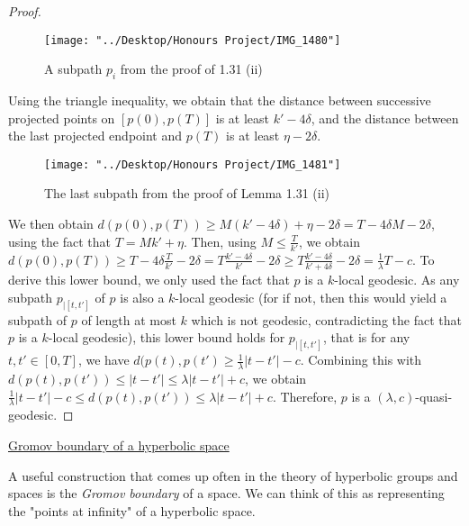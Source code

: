 \documentclass[12pt]{article}
\newcommand{\vs}{\vskip10pt}
\begin{document}
\begin{proof}
		
\begin{figure} [H]
	\centering
	\texttt{[image: "../Desktop/Honours Project/IMG\_1480"]}
	\caption{A subpath $p_i$ from the proof of 1.31 (ii)}
	\label{fig:img1480}
\end{figure}
		
		Using the triangle inequality, we obtain that the distance between successive projected points on $[p(0), p(T)]$ is at least $k' - 4 \delta$, and the distance between the last projected endpoint and $p(T)$ is at least $\eta - 2 \delta$. 
		
		
\begin{figure} [H]
	\centering
	\texttt{[image: "../Desktop/Honours Project/IMG\_1481"]}
	\caption{The last subpath from the proof of Lemma 1.31 (ii)}
	\label{fig:img1481}
\end{figure}
		
		 We then obtain $d(p(0), p(T)) \geq M(k' - 4 \delta) + \eta - 2 \delta = T - 4 \delta M - 2 \delta$, using the fact that $T = Mk' + \eta$. Then, using $M \leq \frac{T}{k'}$, we obtain $d(p(0), p(T)) \geq T - 4 \delta \frac{T}{k'} - 2 \delta = T \frac{k' - 4 \delta}{k'} - 2 \delta \geq T \frac{k' - 4 \delta}{k' + 4 \delta} - 2 \delta = \frac{1}{\lambda} T - c$. To derive this lower bound, we only used the fact that $p$ is a $k$-local geodesic. As any subpath $p_{\vert [t, t']}$ of $p$ is also a $k$-local geodesic (for if not, then this would yield a subpath of $p$ of length at most $k$ which is not geodesic, contradicting the fact that $p$ is a $k$-local geodesic), this lower bound holds for $p_{\vert [t, t']}$, that is for any $t,t' \in [0, T]$, we have $d(p(t), p(t') \geq \frac{1}{\lambda} \vert t - t' \vert - c$. Combining this with $d(p(t), p(t')) \leq \vert t - t' \vert \leq \lambda \vert t - t' \vert + c$, we obtain $ \frac{1}{\lambda} \vert t - t' \vert - c \leq d(p(t), p(t')) \leq \lambda \vert t - t' \vert + c$. Therefore, $p$ is a $(\lambda, c)$-quasi-geodesic. 
				
	\end{proof}

	\vs 

	\underline{Gromov boundary of a hyperbolic space}
	
	\vs 
	
	A useful construction that comes up often in the theory of hyperbolic groups and spaces is the \textit{Gromov boundary} of a space. We can think of this as representing the "points at infinity" of a hyperbolic space. 
	
\end{document}
